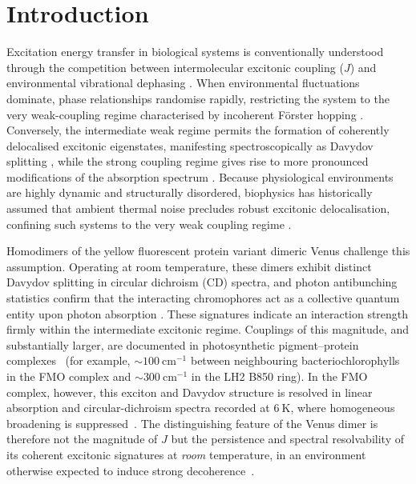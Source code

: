 \documentclass[journal=jpcbfk, manuscript=article, layout=twocolumn, doi=true]{achemso}
\begin{document}
\section{Introduction}
Excitation energy transfer in biological systems is conventionally understood through the competition between intermolecular excitonic coupling ($J$) and environmental vibrational dephasing \cite{forster1965delocalized, may2004charge}. When environmental fluctuations dominate, phase relationships randomise rapidly, restricting the system to the very weak-coupling regime characterised by incoherent Förster hopping \cite{forster1948intermolecular}. Conversely, the intermediate weak regime permits the formation of coherently delocalised excitonic eigenstates, manifesting spectroscopically as Davydov splitting \cite{davydov1971}, while the strong coupling regime gives rise to more pronounced modifications of the absorption spectrum \cite{clegg2006history}. Because physiological environments are highly dynamic and structurally disordered, biophysics has historically assumed that ambient thermal noise precludes robust excitonic delocalisation, confining such systems to the very weak coupling regime \cite{clegg2006history, nelson2018role}.

Homodimers of the yellow fluorescent protein variant dimeric Venus challenge this assumption. Operating at room temperature, these dimers exhibit distinct Davydov splitting in circular dichroism (CD) spectra, and photon antibunching statistics confirm that the interacting chromophores act as a collective quantum entity upon photon absorption \cite{kim2019venusa206, freed2025effect}. These signatures indicate an interaction strength firmly within the intermediate excitonic regime. Couplings of this magnitude, and substantially larger, are documented in photosynthetic pigment--protein complexes~\cite{van2000photosynthetic, adolphs2006proteins, krueger1998} (for example, ${\sim}100~\mathrm{cm^{-1}}$ between neighbouring bacteriochlorophylls in the FMO complex and ${\sim}300~\mathrm{cm^{-1}}$ in the LH2 B850 ring). In the FMO complex, however, this exciton and Davydov structure is resolved in linear absorption and circular-dichroism spectra recorded at $6~\mathrm{K}$, where homogeneous broadening is suppressed~\cite{adolphs2006proteins}. The distinguishing feature of the Venus dimer is therefore not the magnitude of $J$ but the persistence and spectral resolvability of its coherent excitonic signatures at \emph{room} temperature, in an environment otherwise expected to induce strong decoherence~\cite{ishizaki2009unified}.
\end{document}
